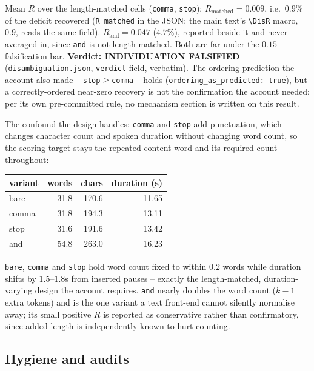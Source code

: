 \documentclass[11pt]{article}
\begin{document}
\noindent Mean $R$ over the length-matched cells (\texttt{comma}, \texttt{stop}):
$R_{\text{matched}}=0.009$, i.e.\ $0.9\%$ of the deficit recovered
(\texttt{R\_matched} in the JSON; the main text's \texttt{\textbackslash DisR}
macro, $0.9$, reads the same field). $R_{\text{and}}=0.047$ ($4.7\%$), reported beside it and never
averaged in, since \texttt{and} is not length-matched. Both are far under the
$0.15$ falsification bar. \textbf{Verdict: INDIVIDUATION FALSIFIED}
(\texttt{disambiguation.json}, \texttt{verdict} field, verbatim). The ordering
prediction the account also made -- \texttt{stop}$\ge$\texttt{comma} -- holds
(\texttt{ordering\_as\_predicted: true}), but a correctly-ordered near-zero
recovery is not the confirmation the account needed; per its own
pre-committed rule, no mechanism section is written on this result.

The confound the design handles: \texttt{comma} and \texttt{stop} add
punctuation, which changes character count and spoken duration without
changing word count, so the scoring target stays the repeated content word
and its required count throughout:

\begin{center}
\begin{tabular}{@{}lrrr@{}}
\toprule
variant & words & chars & duration (s) \\
\midrule
bare  & 31.8 & 170.6 & 11.65 \\
comma & 31.8 & 194.3 & 13.11 \\
stop  & 31.6 & 191.6 & 13.42 \\
and   & 54.8 & 263.0 & 16.23 \\
\bottomrule
\end{tabular}
\end{center}

\noindent \texttt{bare}, \texttt{comma} and \texttt{stop} hold word count
fixed to within $0.2$ words while duration shifts by $1.5$--$1.8$s from
inserted pauses -- exactly the length-matched, duration-varying design the
account requires. \texttt{and} nearly doubles the word count ($k-1$ extra
tokens) and is the one variant a text front-end cannot silently normalise
away; its small positive $R$ is reported as conservative rather than
confirmatory, since added length is independently known to hurt counting.

\subsection{Hygiene and audits}
\end{document}
